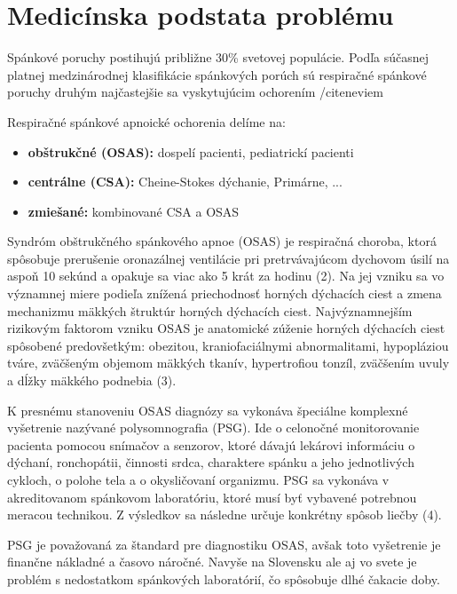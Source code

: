 
\chapter{Medicínska podstata problému} \label{kap:Motivacia}

\pagestyle{fancy}
\fancyhf{}
\fancyfoot[CE,CO]{\thepage}


Spánkové poruchy postihujú približne 30\% svetovej populácie. Podľa súčasnej platnej
medzinárodnej klasifikácie spánkových porúch sú respiračné spánkové poruchy druhým
najčastejšie sa vyskytujúcim ochorením /cite{neviem}

Respiračné spánkové apnoické ochorenia delíme na:

\begin{itemize}
	\item \textbf{obštrukčné (OSAS):} dospelí pacienti, pediatrickí pacienti
	\item \textbf{centrálne (CSA):} Cheine-Stokes dýchanie, Primárne, ...
	\item \textbf{zmiešané:} kombinované CSA a OSAS
\end{itemize}

Syndróm obštrukčného spánkového apnoe (OSAS) je respiračná choroba, ktorá spôsobuje
prerušenie oronazálnej ventilácie pri pretrvávajúcom dychovom úsilí na aspoň 10 sekúnd a
opakuje sa viac ako 5 krát za hodinu (2). Na jej vzniku sa vo významnej miere podieľa znížená
priechodnosť horných dýchacích ciest a zmena mechanizmu mäkkých štruktúr horných dýchacích
ciest. Najvýznamnejším rizikovým faktorom vzniku OSAS je anatomické zúženie horných
dýchacích ciest spôsobené predovšetkým: obezitou, kraniofaciálnymi abnormalitami, hypopláziou
tváre, zväčšeným objemom mäkkých tkanív, hypertrofiou tonzíl, zväčšením uvuly a dĺžky
mäkkého podnebia (3).

K presnému stanoveniu OSAS diagnózy sa vykonáva špeciálne komplexné vyšetrenie nazývané
polysomnografia (PSG). Ide o celonočné monitorovanie pacienta pomocou snímačov a senzorov,
ktoré dávajú lekárovi informáciu o dýchaní, ronchopátii, činnosti srdca, charaktere spánku a jeho
jednotlivých cykloch, o polohe tela a o okysličovaní organizmu. PSG sa vykonáva v
akreditovanom spánkovom laboratóriu, ktoré musí byť vybavené potrebnou meracou technikou. Z
výsledkov sa následne určuje konkrétny spôsob liečby (4).

PSG je považovaná za štandard pre diagnostiku OSAS, avšak toto vyšetrenie je finančne
nákladné a časovo náročné. Navyše na Slovensku ale aj vo svete je problém s nedostatkom
spánkových laboratórií, čo spôsobuje dlhé čakacie doby.

